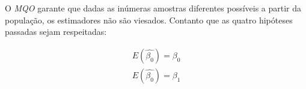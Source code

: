 \documentclass[12pt,a4paper,oneside,brazil]{abntex2}
\begin{document}
O \emph{MQO} garante que dadas as inúmeras amostras diferentes possíveis a partir da população, os estimadores não são viesados. Contanto que as quatro hipóteses passadas sejam respeitadas:

\begin{align}
    E(\hat{\beta_0}) = \beta_0 \\
    E(\hat{\beta_0}) = \beta_1
\end{align} 

\section{}
\printbibliography
\end{document}
